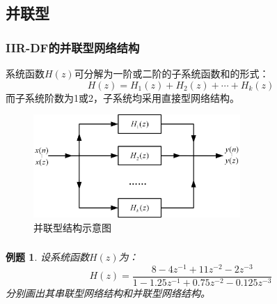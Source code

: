 \documentclass[notheorems,compress,mathserif,table]{beamer}
\newtheorem{example}{例题}
\begin{document}
\subsection{并联型}
\begin{frame}\frametitle{IIR-DF的并联型网络结构}%
%
系统函数$H(z)$可分解为一阶或二阶的子系统函数和的形式：
$$H(z)=H_1(z)+ H_2(z)+ \cdots + H_k(z)$$
而子系统阶数为1或2，子系统均采用直接型网络结构。
\begin{figure}[h]
\centering
\includegraphics[width=0.7\textwidth]{binglianxing.jpg}
\caption{并联型结构示意图}
\end{figure}
\end{frame}
\begin{frame}\frametitle{}%
\begin{example}\label{exp:jilian}
设系统函数$H(z)$为：
$$H(z)=\frac{8-4z^{-1}+11z^{-2}-2z^{-3}}{1-1.25z^{-1}+0.75z^{-2}-0.125z^{-3}}$$
分别画出其串联型网络结构和并联型网络结构。
\end{example}

\end{frame}
\end{document}
